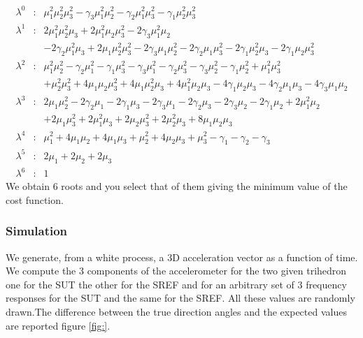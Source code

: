\documentclass[a4paper, 12pt]{report}
\begin{document}
\begin{eqnarray*}
\lambda^{0}&:&
\mu_{1}^2\mu_{2}^2\mu_{3}^2 - \gamma_{3}\mu_{1}^2\mu_{2}^2 - \gamma_{2}\mu_{1}^2\mu_{3}^2 - \gamma_{1}\mu_{2}^2\mu_{3}^2
\\
\lambda^{1}&:&
2\mu_{1}^2\mu_{2}^2\mu_{3} + 2\mu_{1}^2\mu_{2}\mu_{3}^2 - 2\gamma_{3}\mu_{1}^2\mu_{2} \\
&&- 2\gamma_{2}\mu_{1}^2\mu_{3} + 2\mu_{1}\mu_{2}^2\mu_{3}^2 - 2\gamma_{3}\mu_{1}\mu_{2}^2 - 2\gamma_{2}\mu_{1}\mu_{3}^2 - 2\gamma_{1}\mu_{2}^2\mu_{3} - 2\gamma_{1}\mu_{2}\mu_{3}^2
\\
\lambda^{2}&:&
\mu_{1}^2\mu_{2}^2 - \gamma_{2}\mu_{1}^2 - \gamma_{1}\mu_{3}^2 - \gamma_{3}\mu_{1}^2 - \gamma_{2}\mu_{3}^2 - \gamma_{3}\mu_{2}^2 - \gamma_{1}\mu_{2}^2 + \mu_{1}^2\mu_{3}^2 \\
&&+ \mu_{2}^2\mu_{3}^2 + 4\mu_{1}\mu_{2}\mu_{3}^2 + 4\mu_{1}\mu_{2}^2\mu_{3} + 4\mu_{1}^2\mu_{2}\mu_{3} - 4\gamma_{1}\mu_{2}\mu_{3} - 4\gamma_{2}\mu_{1}\mu_{3} - 4\gamma_{3}\mu_{1}\mu_{2}
\\
\lambda^{3}&:&
2\mu_{1}\mu_{2}^2 - 2\gamma_{2}\mu_{1} - 2\gamma_{1}\mu_{3} - 2\gamma_{3}\mu_{1} - 2\gamma_{2}\mu_{3} - 2\gamma_{3}\mu_{2} - 2\gamma_{1}\mu_{2} + 2\mu_{1}^2\mu_{2} \\
&&+ 2\mu_{1}\mu_{3}^2 + 2\mu_{1}^2\mu_{3} + 2\mu_{2}\mu_{3}^2 + 2\mu_{2}^2\mu_{3} + 8\mu_{1}\mu_{2}\mu_{3}
\\
\lambda^{4}&:&
\mu_{1}^2 + 4\mu_{1}\mu_{2} + 4\mu_{1}\mu_{3} + \mu_{2}^2 + 4\mu_{2}\mu_{3} + \mu_{3}^2 - \gamma_{1} - \gamma_{2} - \gamma_{3}
\\
\lambda^{5}&:&2\mu_{1} + 2\mu_{2} + 2\mu_{3}
\\
\lambda^{6}&:&1
\end{eqnarray*}
We obtain 6 roots and you select that of them giving  the minimum value of the cost function.
 \subsubsection{Simulation}
 We generate, from a white process, a 3D acceleration vector as a function of time. We compute the 3 components of the accelerometer for the two given trihedron one for the SUT  the other for the SREF and for an arbitrary set of 3 frequency responses for the SUT and the same for the SREF. All these values are randomly drawn.The difference between the true direction angles and the expected values are reported figure \ref{fig:}.
\end{document}
